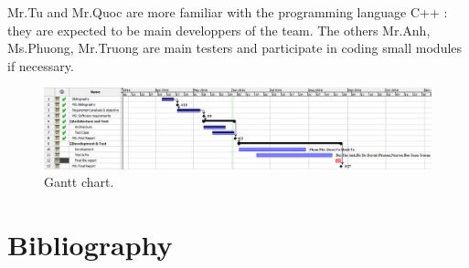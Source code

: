 \documentclass[11pt]{article}
\begin{document}
\par\noindent Mr.Tu and Mr.Quoc are more familiar with the programming language C++ : they are expected to be main developpers of the team. The others Mr.Anh, Ms.Phuong, Mr.Truong are main testers and participate in coding small modules if necessary.
\begin{figure}[H] 
  \includegraphics[width=\linewidth]{P2.jpg}
  \caption{Gantt chart.}
  \label{fig:gantt2}
\end{figure} 


\section{Bibliography}
\end{document}

